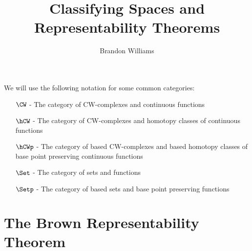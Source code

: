 









\title{\Large Classifying Spaces and Representability Theorems}
\author{\large Brandon Williams}

\maketitle



We will use the following notation for some common categories:
\begin{enumerate}
  \item[$\CW$] - The category of CW-complexes and continuous functions
  \item[$\hCW$] - The category of CW-complexes and homotopy classes of continuous functions
  \item[$\hCWp$] - The category of based CW-complexes and based homotopy classes of base point preserving continuous functions
  \item[$\Set$] - The category of sets and functions
  \item[$\Setp$] - The category of based sets and base point preserving functions
\end{enumerate}


\section{The Brown Representability Theorem}

